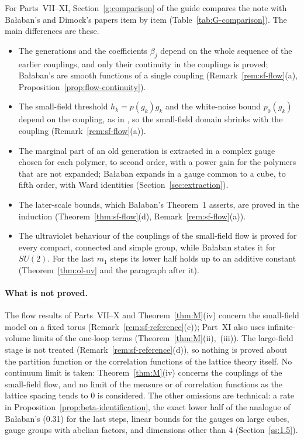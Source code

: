 For Parts~VII--XI, Section~\ref{g:comparison} of the guide compares the note with Ba\l aban's and Dimock's papers item by item (Table~\ref{tab:G-comparison}). The main differences are these.
\begin{itemize}
\item The generations and the coefficients $\beta_j$ depend on the whole sequence of the earlier couplings, and only their continuity in the couplings is proved; Ba\l aban's are smooth functions of a single coupling (Remark~\ref{rem:sf-flow}(a), Proposition~\ref{prop:flow-continuity}).
\item The small-field threshold $h_k=p(g_k)g_k$ and the white-noise bound $p_0(g_k)$ depend on the coupling, as in \cite{DimockI}, so the small-field domain shrinks with the coupling (Remark~\ref{rem:sf-flow}(a)).
\item The marginal part of an old generation is extracted in a complex gauge chosen for each polymer, to second order, with a power gain for the polymers that are not expanded; Ba\l aban expands in a gauge common to a cube, to fifth order, with Ward identities (Section~\ref{sec:extraction}).
\item The later-scale bounds, which Ba\l aban's Theorem~1 asserts, are proved in the induction (Theorem~\ref{thm:sf-flow}(d), Remark~\ref{rem:sf-flow}(a)).
\item The ultraviolet behaviour of the couplings of the small-field flow is proved for every compact, connected and simple group, while Ba\l aban states it for $SU(2)$. For the last $m_1$ steps its lower half holds up to an additive constant (Theorem~\ref{thm:ol-uv} and the paragraph after it).
\end{itemize}

\paragraph{What is not proved.} The flow results of Parts~VII--X and Theorem~\ref{thm:M}(iv) concern the small-field model on a fixed torus (Remark~\ref{rem:sf-reference}(c)); Part~XI also uses infinite-volume limits of the one-loop terms (Theorem~\ref{thm:M}(ii),~(iii)). The large-field stage is not treated (Remark~\ref{rem:sf-reference}(d)), so nothing is proved about the partition function or the correlation functions of the lattice theory itself. No continuum limit is taken: Theorem~\ref{thm:M}(iv) concerns the couplings of the small-field flow, and no limit of the measure or of correlation functions as the lattice spacing tends to $0$ is considered. The other omissions are technical: a rate in Proposition~\ref{prop:beta-identification}, the exact lower half of the analogue of Ba\l aban's (0.31) for the last steps, linear bounds for the gauges on large cubes, gauge groups with abelian factors, and dimensions other than $4$ (Section~\ref{ss:1.5}).

